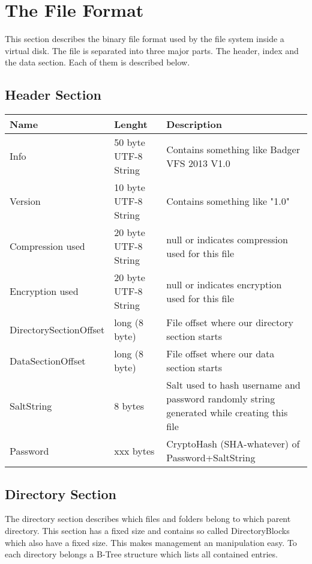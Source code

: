 
\section{The File Format}


This section describes the binary file format used by the file system inside a
virtual disk.
The file is separated into three major parts. The header, index and the data
section. Each of them is described below.

\subsection{Header Section}

\begin{tabular}{|l|l|p{5cm}|}
\hline
  \textbf{Name} & \textbf{Lenght} & \textbf{Description}
\\  \hline
  Info & 50 byte UTF-8 String & Contains something like Badger VFS 2013 V1.0 
\\ \hline
  Version & 10 byte UTF-8 String & Contains something like "1.0"
\\ \hline
  Compression used & 20 byte UTF-8 String & null or indicates compression used for this file
\\ \hline
  Encryption used & 20 byte UTF-8 String & null or indicates encryption used for this file
\\ \hline
 DirectorySectionOffset & long (8 byte) &  File offset where our directory section
 starts \\ \hline
 DataSectionOffset & long (8 byte) &  File offset where our data section starts
\\ \hline
 SaltString & 8 bytes  & Salt used to hash username and password randomly string generated while creating this
   file
 \\ \hline
  Password & xxx bytes  & CryptoHash (SHA-whatever) of Password+SaltString
\\ \hline

\end{tabular}


\subsection{Directory Section}

The directory section describes which files and folders belong to which parent directory. This section has a fixed size and contains so called DirectoryBlocks which also have a fixed size. This makes management an manipulation easy. To each directory belongs a B-Tree structure which lists all contained entries.


